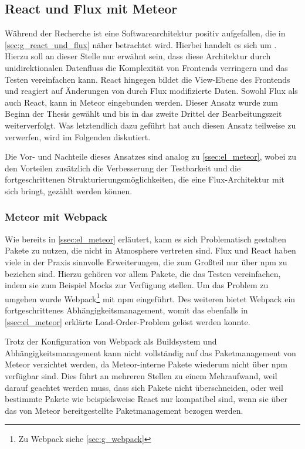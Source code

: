 \subsection{React und Flux mit Meteor}
\label{ssec:el_react_und_flux_mit_meteor}

Während der Recherche ist eine Softwarearchitektur positiv aufgefallen, die in
\cref{sec:g_react_und_flux} näher betrachtet wird.  Hierbei handelt es sich um
.  Hierzu soll an dieser Stelle nur erwähnt sein, dass diese
Architektur durch unidirektionalen Datenfluss die Komplexität von Frontends
verringern und das Testen vereinfachen kann.  React hingegen bildet die
View-Ebene des Frontends und reagiert auf Änderungen von durch Flux modifizierte
Daten.  Sowohl Flux als auch React, kann in Meteor eingebunden werden.  Dieser
Ansatz wurde zum Beginn der Thesis gewählt und bis in das zweite Drittel der
Bearbeitungszeit weiterverfolgt.  Was letztendlich dazu geführt hat auch diesen
Ansatz teilweise zu verwerfen, wird im Folgenden diskutiert.

Die Vor- und Nachteile dieses Ansatzes sind analog zu \cref{ssec:el_meteor},
wobei zu den Vorteilen zusätzlich die Verbesserung der Testbarkeit und die
fortgeschrittenen Strukturierungsmöglichkeiten, die eine Flux-Architektur mit
sich bringt, gezählt werden können.

\subsubsection{Meteor mit Webpack}
\label{sssec:elf_meteor_mit_webpack}

Wie bereits in \cref{ssec:el_meteor} erläutert, kann es sich Problematisch
gestalten Pakete zu nutzen, die nicht in Atmosphere vertreten sind.  Flux und
React haben viele in der Praxis sinnvolle Erweiterungen, die zum Großteil nur
über npm zu beziehen sind.  Hierzu gehören vor allem Pakete, die das Testen
vereinfachen, indem sie zum Beispiel Mocks zur Verfügung stellen.  Um das
Problem zu umgehen wurde Webpack\footnote{Zu Webpack siehe \cref{sec:g_webpack}}
mit npm eingeführt.  Des weiteren bietet Webpack ein fortgeschrittenes
Abhängigkeitsmanagement, womit das ebenfalls in \cref{ssec:el_meteor} erklärte
Load-Order-Problem gelöst werden konnte.

Trotz der Konfiguration von Webpack als Buildsystem und Abhängigkeitsmanagement
kann nicht vollständig auf das Paketmanagement von Meteor verzichtet werden, da
Meteor-interne Pakete wiederum nicht über npm verfügbar sind.  Dies führt an
mehreren Stellen zu einem Mehraufwand, weil darauf geachtet werden muss, dass
sich Pakete nicht überschneiden, oder weil bestimmte Pakete wie beispielsweise
React nur kompatibel sind, wenn sie über das von Meteor bereitgestellte
Paketmanagement bezogen werden.

